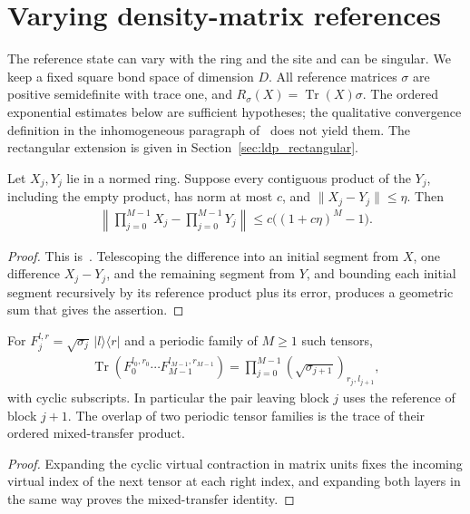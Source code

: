 \section{Varying density-matrix references}
\label{sec:ldp_varying_reference}

The reference state can vary with the ring and the site and can be singular.
We keep a fixed square bond space of dimension $D$. All reference matrices
$\sigma$ are positive semidefinite with trace one, and
$R_\sigma(X)=\operatorname{Tr}(X)\sigma$.
The ordered exponential estimates below are sufficient hypotheses; the
qualitative convergence definition in the inhomogeneous paragraph
of~\cite{Malz2024Preparation} does not yield them.
The rectangular extension is given in Section~\ref{sec:ldp_rectangular}.

\begin{lemma}
    \label{thm:ldp_varying_reference_products}
    \leanok
    Let $X_j,Y_j$ lie in a normed ring. Suppose every contiguous product of
    the $Y_j$, including the empty product, has norm at most $c$, and
    $\|X_j-Y_j\|\le\eta$. Then
    \begin{align}
        \left\|\prod_{j=0}^{M-1}X_j-\prod_{j=0}^{M-1}Y_j\right\|
        \le c\bigl((1+c\eta)^M-1\bigr).
    \end{align}
\end{lemma}
\begin{proof}\leanok
    This is~\cite[``Ordered perturbations of varying
        references'']{QICLean2026Blueprint}.
    Telescoping the difference into an initial segment from $X$, one
    difference $X_j-Y_j$, and the remaining segment from $Y$, and bounding each
    initial segment recursively by its reference product plus its error,
    produces a geometric sum that gives the assertion.
\end{proof}

\begin{lemma}
    \label{thm:ldp_varying_reference_pairs}
    \leanok
    For $F_j^{l,r}=\sqrt{\sigma_j}\,|l\rangle\langle r|$ and a periodic
    family of $M\ge1$ such tensors,
    \begin{align}
        \operatorname{Tr}(F_0^{l_0,r_0}\cdots F_{M-1}^{l_{M-1},r_{M-1}})
        =\prod_{j=0}^{M-1}(\sqrt{\sigma_{j+1}})_{r_j,l_{j+1}},
    \end{align}
    with cyclic subscripts. In particular the pair leaving block $j$
    uses the reference of block $j+1$. The overlap of two periodic tensor
    families is the trace of their ordered mixed-transfer product.
\end{lemma}
\begin{proof}\leanok
    Expanding the cyclic virtual contraction in matrix units fixes the
    incoming virtual index of the next tensor at each right index, and
    expanding both layers in the same way proves the mixed-transfer identity.
\end{proof}

